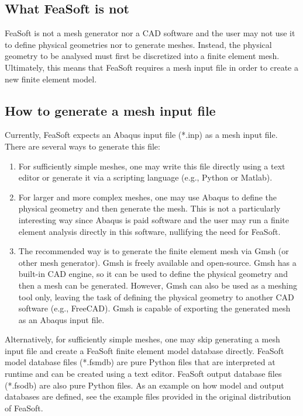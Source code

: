 \documentclass[
    11pt,        %
    a4paper,     %
    final,       %
    fleqn,       %
    notitlepage, %
    onecolumn,   %
    oneside,     %
]{article}
\begin{document}
\subsection{What FeaSoft is not}

FeaSoft is not a mesh generator nor a CAD software and the user may not use it to define physical geometries nor to generate meshes. Instead, the physical geometry to be analysed must first be discretized into a finite element mesh. Ultimately, this means that FeaSoft requires a mesh input file in order to create a new finite element model.

\subsection{How to generate a mesh input file}

Currently, FeaSoft expects an Abaqus input file (*.inp) as a mesh input file. There are several ways to generate this file:
\begin{enumerate}
    \item For sufficiently simple meshes, one may write this file directly using a text editor or generate it via a scripting language (e.g., Python or Matlab).
    \item For larger and more complex meshes, one may use Abaqus to define the physical geometry and then generate the mesh. This is not a particularly interesting way since Abaqus is paid software and the user may run a finite element analysis directly in this software, nullifying the need for FeaSoft.
    \item The recommended way is to generate the finite element mesh via Gmsh (or other mesh generator). Gmsh is freely available and open-source. Gmsh has a built-in CAD engine, so it can be used to define the physical geometry and then a mesh can be generated. However, Gmsh can also be used as a meshing tool only, leaving the task of defining the physical geometry to another CAD software (e.g., FreeCAD). Gmsh is capable of exporting the generated mesh as an Abaqus input file.
\end{enumerate}

Alternatively, for sufficiently simple meshes, one may skip generating a mesh input file and create a FeaSoft finite element model database directly. FeaSoft model database files (*.fs\textunderscore mdb) are pure Python files that are interpreted at runtime and can be created using a text editor. FeaSoft output database files (*.fs\textunderscore odb) are also pure Python files. As an example on how model and output databases are defined, see the example files provided in the original distribution of FeaSoft.
\end{document}
